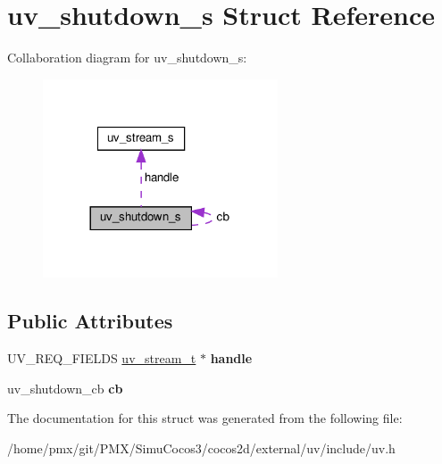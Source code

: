 \hypertarget{structuv__shutdown__s}{}\section{uv\+\_\+shutdown\+\_\+s Struct Reference}
\label{structuv__shutdown__s}


Collaboration diagram for uv\+\_\+shutdown\+\_\+s\+:
\nopagebreak
\begin{figure}[H]
\begin{center}
\leavevmode
\includegraphics[width=197pt]{structuv__shutdown__s__coll__graph}
\end{center}
\end{figure}
\subsection*{Public Attributes}
\begin{DoxyCompactItemize}
\item 
\mbox{\label{structuv__shutdown__s_a69639553c16eee17acab38ca74826d33}} 
U\+V\+\_\+\+R\+E\+Q\+\_\+\+F\+I\+E\+L\+DS \hyperlink{structuv__stream__s}{uv\+\_\+stream\+\_\+t} $\ast$ {\bfseries handle}
\item 
\mbox{\label{structuv__shutdown__s_ac54feff773abdff7e92911d4a98263a5}} 
uv\+\_\+shutdown\+\_\+cb {\bfseries cb}
\end{DoxyCompactItemize}


The documentation for this struct was generated from the following file\+:\begin{DoxyCompactItemize}
\item 
/home/pmx/git/\+P\+M\+X/\+Simu\+Cocos3/cocos2d/external/uv/include/uv.\+h\end{DoxyCompactItemize}
